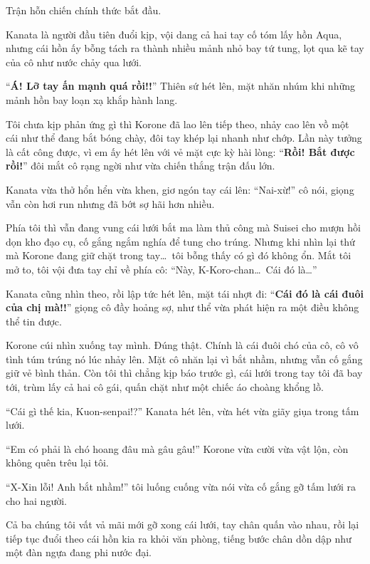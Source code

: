 \documentclass[../main.tex]{subfiles}
\begin{document}
Trận hỗn chiến chính thức bắt đầu.

Kanata là người đầu tiên đuổi kịp, vội dang cả hai tay cố tóm lấy hồn Aqua, nhưng cái hồn ấy bỗng tách ra thành nhiều mảnh nhỏ bay tứ tung, lọt qua kẽ tay của cô như nước chảy qua lưới.


``\textbf{Á! Lỡ tay ấn mạnh quá rồi!!}'' Thiên sứ hét lên, mặt nhăn nhúm khi những mảnh hồn bay loạn xạ khắp hành lang.

Tôi chưa kịp phản ứng gì thì Korone đã lao lên tiếp theo, nhảy cao lên vồ một cái như thể đang bắt bóng chày, đôi tay khép lại nhanh như chớp. Lần này tưởng là cất công được, vì em ấy hét lên với vẻ mặt cực kỳ hài lòng: ``\textbf{Rồi! Bắt được rồi!}'' đôi mắt cô rạng ngời như vừa chiến thắng trận đấu lớn.

Kanata vừa thở hổn hển vừa khen, giơ ngón tay cái lên: ``Nai-xừ!'' cô nói, giọng vẫn còn hơi run nhưng đã bớt sợ hãi hơn nhiều.

Phía tôi thì vẫn đang vung cái lưới bắt ma làm thủ công mà Suisei cho mượn hồi dọn kho đạo cụ, cố gắng ngắm nghía để tung cho trúng. Nhưng khi nhìn lại thứ mà Korone đang giữ chặt trong tay\dots\ tôi bỗng thấy có gì đó không ổn. Mắt tôi mở to, tôi vội đưa tay chỉ về phía cô: ``Này, K-Koro-chan\dots\ Cái đó là\dots''

Kanata cũng nhìn theo, rồi lập tức hét lên, mặt tái nhợt đi: ``\textbf{Cái đó là cái đuôi của chị mà!!}'' giọng cô đầy hoảng sợ, như thể vừa phát hiện ra một điều không thể tin được.


Korone cúi nhìn xuống tay mình. Đúng thật. Chính là cái đuôi chó của cô, cô vô tình túm trúng nó lúc nhảy lên. Mặt cô nhăn lại vì bắt nhầm, nhưng vẫn cố gắng giữ vẻ bình thản. Còn tôi thì chẳng kịp báo trước gì, cái lưới trong tay tôi đã bay tới, trùm lấy cả hai cô gái, quấn chặt như một chiếc áo choàng khổng lồ.

``Cái gì thế kia, Kuon-senpai!?'' Kanata hét lên, vừa hét vừa giãy giụa trong tấm lưới.

``Em có phải là chó hoang đâu mà gâu gâu!'' Korone vừa cười vừa vật lộn, còn không quên trêu lại tôi.

``X-Xin lỗi! Anh bắt nhầm!'' tôi luống cuống vừa nói vừa cố gắng gỡ tấm lưới ra cho hai người.

Cả ba chúng tôi vất vả mãi mới gỡ xong cái lưới, tay chân quấn vào nhau, rồi lại tiếp tục đuổi theo cái hồn kia ra khỏi văn phòng, tiếng bước chân dồn dập như một đàn ngựa đang phi nước đại.
\end{document}
